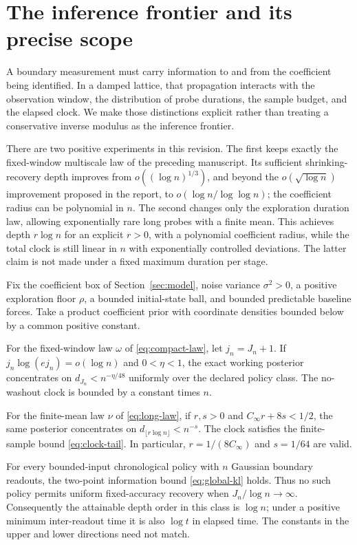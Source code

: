 \section{The inference frontier and its precise scope}
\label{sec:intro}
A boundary measurement must carry information to and from the coefficient
being identified. In a damped lattice, that propagation interacts with the
observation window, the distribution of probe durations, the sample budget,
and the elapsed clock. We make those distinctions explicit rather than treating
a conservative inverse modulus as the inference frontier.

There are two positive experiments in this revision. The first keeps exactly
the fixed-window multiscale law of the preceding manuscript. Its sufficient
shrinking-recovery depth improves from $o((\log n)^{1/3})$, and beyond the
$o(\sqrt{\log n})$ improvement proposed in the report, to
$o(\log n/\log\log n)$; the coefficient radius can be polynomial in $n$.
The second changes only the exploration duration law, allowing exponentially
rare long probes with a finite mean. This achieves depth $r\log n$ for an
explicit $r>0$, with a polynomial coefficient radius, while the total clock
is still linear in $n$ with exponentially controlled deviations. The latter
claim is not made under a fixed maximum duration per stage.

\begin{theorem}
\label{thm:main}
Fix the coefficient box of Section~\ref{sec:model}, noise variance $\sigma^2>0$,
a positive exploration floor $\rho$, a bounded initial-state ball, and bounded
predictable baseline forces. Take a product coefficient prior with coordinate
densities bounded below by a common positive constant.

For the fixed-window law $\omega$ of \eqref{eq:compact-law}, let $j_n=J_n+1$.
If $j_n\log(ej_n)=o(\log n)$ and $0<\eta<1$, the exact working posterior
concentrates on $d_{J_n}<n^{-\eta/48}$ uniformly over the declared policy class.
The no-washout clock is bounded by a constant times $n$.

For the finite-mean law $\nu$ of \eqref{eq:long-law}, if $r,s>0$ and
$C_\infty r+8s<1/2$, the same posterior concentrates on
$d_{\lfloor r\log n\rfloor}<n^{-s}$. The clock satisfies the finite-sample
bound \eqref{eq:clock-tail}. In particular, $r=1/(8C_\infty)$ and $s=1/64$
are valid.

For every bounded-input chronological policy with $n$ Gaussian boundary
readouts, the two-point information bound \eqref{eq:global-kl} holds. Thus no
such policy permits uniform fixed-accuracy recovery when $J_n/\log n\to\infty$.
Consequently the attainable depth order in this class is $\log n$; under a
positive minimum inter-readout time it is also $\log t$ in elapsed time.
The constants in the upper and lower directions need not match.
\end{theorem}

